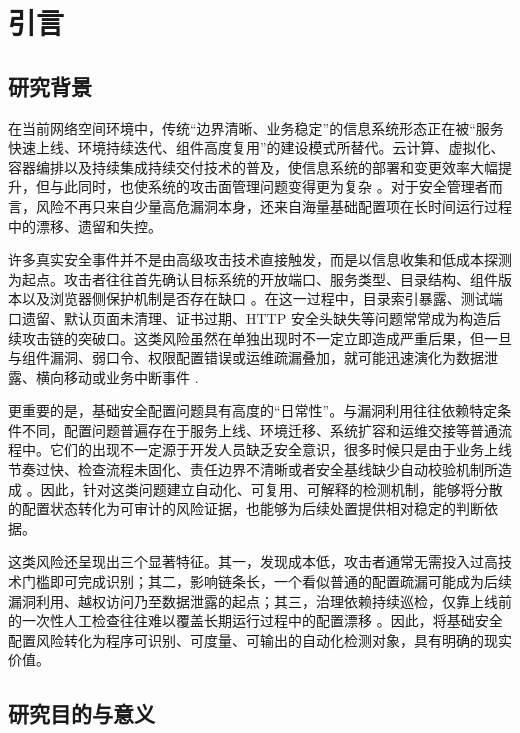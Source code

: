 \documentclass[12pt,a4paper,fontset=none]{ctexart}
\begin{document}
\newpage
\tableofcontents
\newpage
{}

\section{引言}

\subsection{研究背景}

在当前网络空间环境中，传统“边界清晰、业务稳定”的信息系统形态正在被“服务快速上线、环境持续迭代、组件高度复用”的建设模式所替代。云计算、虚拟化、容器编排以及持续集成持续交付技术的普及，使信息系统的部署和变更效率大幅提升，但与此同时，也使系统的攻击面管理问题变得更为复杂 \cite{nist,nist-vuln,nist-csf,owasp-top10}。对于安全管理者而言，风险不再只来自少量高危漏洞本身，还来自海量基础配置项在长时间运行过程中的漂移、遗留和失控。

许多真实安全事件并不是由高级攻击技术直接触发，而是以信息收集和低成本探测为起点。攻击者往往首先确认目标系统的开放端口、服务类型、目录结构、组件版本以及浏览器侧保护机制是否存在缺口 \cite{wstg,nessus-guide,nmap-book,shodan}。在这一过程中，目录索引暴露、测试端口遗留、默认页面未清理、证书过期、HTTP 安全头缺失等问题常常成为构造后续攻击链的突破口。这类风险虽然在单独出现时不一定立即造成严重后果，但一旦与组件漏洞、弱口令、权限配置错误或运维疏漏叠加，就可能迅速演化为数据泄露、横向移动或业务中断事件 \cite{nist-server,owasp-asvs,cis-controls,mitre-attck}.

更重要的是，基础安全配置问题具有高度的“日常性”。与漏洞利用往往依赖特定条件不同，配置问题普遍存在于服务上线、环境迁移、系统扩容和运维交接等普通流程中。它们的出现不一定源于开发人员缺乏安全意识，很多时候只是由于业务上线节奏过快、检查流程未固化、责任边界不清晰或者安全基线缺少自动校验机制所造成 \cite{devsecops,ssdlc,secure-by-design,nist-scrm}。因此，针对这类问题建立自动化、可复用、可解释的检测机制，能够将分散的配置状态转化为可审计的风险证据，也能够为后续处置提供相对稳定的判断依据。

这类风险还呈现出三个显著特征。其一，发现成本低，攻击者通常无需投入过高技术门槛即可完成识别；其二，影响链条长，一个看似普通的配置疏漏可能成为后续漏洞利用、越权访问乃至数据泄露的起点；其三，治理依赖持续巡检，仅靠上线前的一次性人工检查往往难以覆盖长期运行过程中的配置漂移 \cite{owasp-cheatsheet,nist-80053,cis-benchmarks,ops-report}。因此，将基础安全配置风险转化为程序可识别、可度量、可输出的自动化检测对象，具有明确的现实价值。

\subsection{研究目的与意义}
\end{document}
